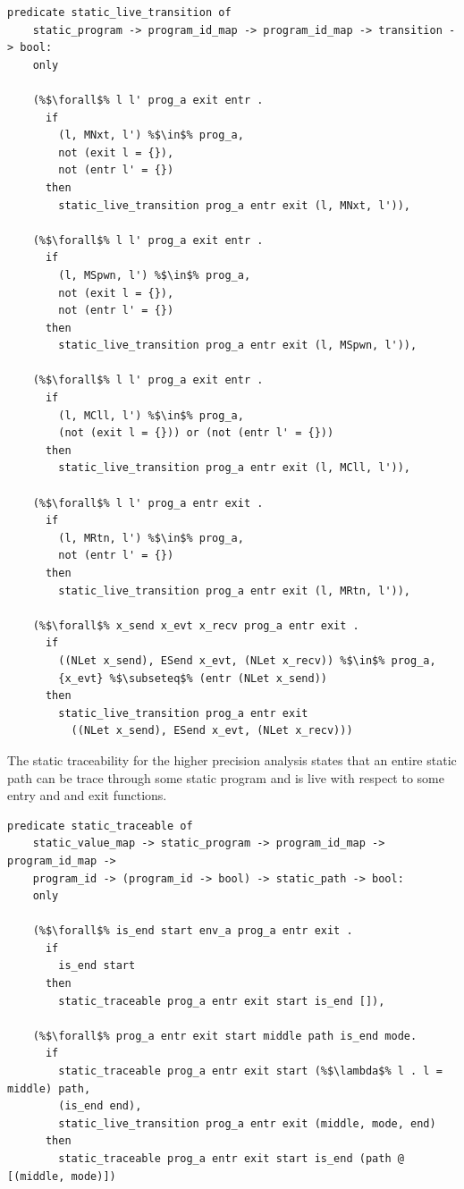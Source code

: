 \documentclass{article}
\begin{document}
\begin{lstlisting}[language=logic, escapechar=\%]
  predicate static_live_transition of
    static_program -> program_id_map -> program_id_map -> transition -> bool:
    only

    (%$\forall$% l l' prog_a exit entr . 
      if
        (l, MNxt, l') %$\in$% prog_a,
        not (exit l = {}),
        not (entr l' = {})
      then
        static_live_transition prog_a entr exit (l, MNxt, l')),

    (%$\forall$% l l' prog_a exit entr .
      if
        (l, MSpwn, l') %$\in$% prog_a, 
        not (exit l = {}),
        not (entr l' = {})
      then
        static_live_transition prog_a entr exit (l, MSpwn, l')),

    (%$\forall$% l l' prog_a exit entr .
      if
        (l, MCll, l') %$\in$% prog_a,
        (not (exit l = {})) or (not (entr l' = {}))
      then
        static_live_transition prog_a entr exit (l, MCll, l')),

    (%$\forall$% l l' prog_a entr exit .
      if
        (l, MRtn, l') %$\in$% prog_a,
        not (entr l' = {})
      then
        static_live_transition prog_a entr exit (l, MRtn, l')),

    (%$\forall$% x_send x_evt x_recv prog_a entr exit .
      if
        ((NLet x_send), ESend x_evt, (NLet x_recv)) %$\in$% prog_a, 
        {x_evt} %$\subseteq$% (entr (NLet x_send))
      then
        static_live_transition prog_a entr exit
          ((NLet x_send), ESend x_evt, (NLet x_recv)))
  \end{lstlisting}

The static traceability for the higher precision analysis states
that an entire static path can be trace through some static program and
is live with respect to some entry and and exit functions.

\begin{lstlisting}[language=logic, escapechar=\%]
  predicate static_traceable of
    static_value_map -> static_program -> program_id_map -> program_id_map ->
    program_id -> (program_id -> bool) -> static_path -> bool:
    only

    (%$\forall$% is_end start env_a prog_a entr exit .
      if
        is_end start
      then
        static_traceable prog_a entr exit start is_end []),

    (%$\forall$% prog_a entr exit start middle path is_end mode. 
      if
        static_traceable prog_a entr exit start (%$\lambda$% l . l = middle) path, 
        (is_end end),
        static_live_transition prog_a entr exit (middle, mode, end) 
      then
        static_traceable prog_a entr exit start is_end (path @ [(middle, mode)])
  \end{lstlisting}
\end{document}
